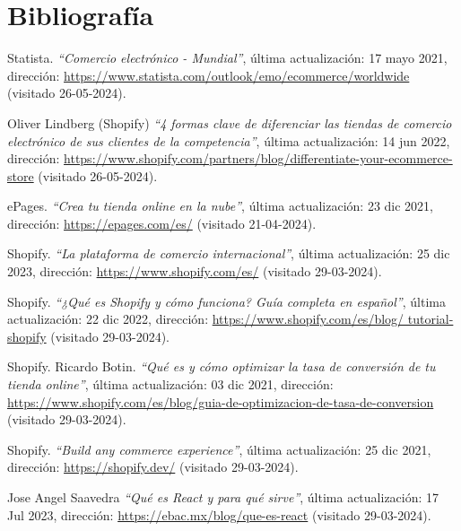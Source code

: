 \documentclass[11pt]{article}
\begin{document}
\section{Bibliografía}
\renewcommand{\refname}{}
\begin{thebibliography}{100} %
    
    Statista. 
    \textit{``Comercio electrónico - Mundial''}, última actualización: 17 mayo 2021, dirección: \url{https://www.statista.com/outlook/emo/ecommerce/worldwide} (visitado 26-05-2024).

    Oliver Lindberg (Shopify)
    \textit{``4 formas clave de diferenciar las tiendas de comercio electrónico de sus clientes de la competencia''}, última actualización: 14 jun 2022, dirección: \url{https://www.shopify.com/partners/blog/differentiate-your-ecommerce-store} (visitado 26-05-2024).

    ePages. 
    \textit{``Crea tu tienda online en la nube''}, última actualización: 23 dic 2021, dirección: \url{https://epages.com/es/} (visitado 21-04-2024).

    Shopify. 
    \textit{``La plataforma de comercio internacional''}, última actualización: 25 dic 2023, dirección: \url{https://www.shopify.com/es/} (visitado 29-03-2024).

    Shopify. 
    \textit{ ``¿Qué es Shopify y cómo funciona? Guía completa en español''},  última actualización: 22 dic 2022, dirección: \url{https://www.shopify.com/es/blog/
    tutorial-shopify} (visitado 29-03-2024).

    Shopify. Ricardo Botin. 
    \textit{``Qué es y cómo optimizar la tasa de conversión de tu tienda online''}, última actualización: 03 dic 2021, dirección: \url{https://www.shopify.com/es/blog/guia-de-optimizacion-de-tasa-de-conversion} (visitado 29-03-2024).

    Shopify. 
    \textit{``Build any commerce experience''}, última actualización: 25 dic 2021, dirección: \url{https://shopify.dev/} (visitado 29-03-2024).

    Jose Angel Saavedra
    \textit{``Qué es React y para qué sirve''}, última actualización: 17 Jul 2023, dirección: \url{https://ebac.mx/blog/que-es-react} (visitado 29-03-2024).


\end{thebibliography}
\end{document}

